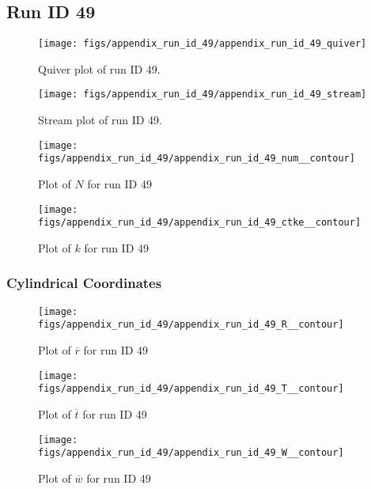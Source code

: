 \subsection{Run ID 49}
\begin{figure}[H]
\centering
\texttt{[image: figs/appendix\_run\_id\_49/appendix\_run\_id\_49\_quiver]}
\caption{Quiver plot of run ID 49.}
\label{fig:appendix_run_id_49_quiver}
\end{figure}


\begin{figure}[H]
\centering
\texttt{[image: figs/appendix\_run\_id\_49/appendix\_run\_id\_49\_stream]}
\caption{Stream plot of run ID 49.}
\label{fig:appendix_run_id_49_stream}
\end{figure}


\begin{figure}[H]
\centering
\texttt{[image: figs/appendix\_run\_id\_49/appendix\_run\_id\_49\_num\_\_contour]}
\caption{Plot of $N$ for run ID 49}
\label{fig:appendix_run_id_49_num__contour}
\end{figure}


\begin{figure}[H]
\centering
\texttt{[image: figs/appendix\_run\_id\_49/appendix\_run\_id\_49\_ctke\_\_contour]}
\caption{Plot of $k$ for run ID 49}
\label{fig:appendix_run_id_49_ctke__contour}
\end{figure}


\subsubsection{Cylindrical Coordinates}
\begin{figure}[H]
\centering
\texttt{[image: figs/appendix\_run\_id\_49/appendix\_run\_id\_49\_R\_\_contour]}
\caption{Plot of $\overline{r}$ for run ID 49}
\label{fig:appendix_run_id_49_R__contour}
\end{figure}


\begin{figure}[H]
\centering
\texttt{[image: figs/appendix\_run\_id\_49/appendix\_run\_id\_49\_T\_\_contour]}
\caption{Plot of $\overline{t}$ for run ID 49}
\label{fig:appendix_run_id_49_T__contour}
\end{figure}


\begin{figure}[H]
\centering
\texttt{[image: figs/appendix\_run\_id\_49/appendix\_run\_id\_49\_W\_\_contour]}
\caption{Plot of $\overline{w}$ for run ID 49}
\label{fig:appendix_run_id_49_W__contour}
\end{figure}



